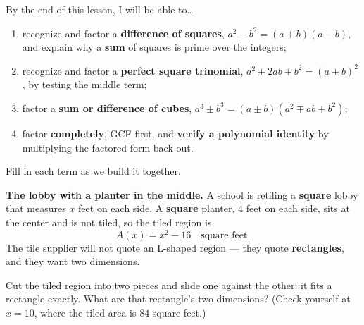 \documentclass[10pt]{article}
\begin{document}

\vspace{0.15in}

\begin{objectivebox}
\small
By the end of this lesson, I will be able to\dots
\begin{enumerate}[leftmargin=1.5em, itemsep=2pt, topsep=3pt]
  \item recognize and factor a \textbf{difference of squares}, $a^2-b^2 = (a+b)(a-b)$, and explain
        why a \textbf{sum} of squares is prime over the integers;
  \item recognize and factor a \textbf{perfect square trinomial}, $a^2 \pm 2ab + b^2 =
        (a \pm b)^2$, by testing the middle term;
  \item factor a \textbf{sum or difference of cubes}, $a^3 \pm b^3 = (a \pm b)(a^2 \mp ab + b^2)$;
  \item factor \textbf{completely}, GCF first, and \textbf{verify a polynomial identity} by
        multiplying the factored form back out.
\end{enumerate}
\end{objectivebox}

\vspace{0.10in}

\boxguard
\begin{vocabbox}
\small
Fill in each term as we build it together.
\end{vocabbox}

\vspace{0.10in}

\boxguard[12]
\begin{hookbox}
\small
\textbf{The lobby with a planter in the middle.} A school is retiling a \textbf{square} lobby that
measures $x$ feet on each side. A \textbf{square} planter, $4$ feet on each side, sits at the center
and is not tiled, so the tiled region is
\[ A(x) = x^2-16 \quad \text{square feet.} \]
The tile supplier will not quote an L-shaped region --- they quote \textbf{rectangles}, and they
want two dimensions.

Cut the tiled region into two pieces and slide one against the other: it fits a rectangle exactly.
What are that rectangle's two dimensions? (Check yourself at $x=10$, where the tiled area is $84$
square feet.)

\end{hookbox}
\end{document}
